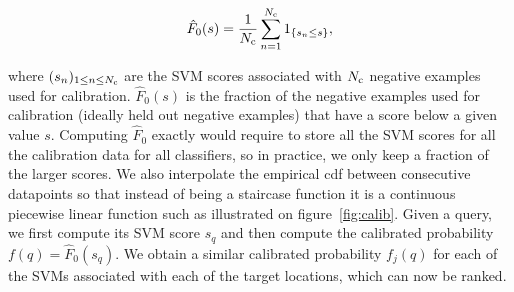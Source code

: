       \begin{equation}
        \hat{F}_0(s)=\frac{1}{N_{\text{c}}} \sum_{n=1}^{N_{\text{c}}} 1_{\{s_n \leq s\}},
        \label{eq:empiricalCDF}
      \end{equation}

      \noindent
      where $(s_n)_{1\leq n \leq N_{\text{c}} }$ are the SVM scores associated with $N_{\text{c}}$ negative examples used for calibration.
      $\hat{F}_0(s)$ 
      is the fraction of the negative examples used for calibration (ideally held out negative examples) that have a score below a given value $s$.
      Computing $\hat{F}_0$ exactly would require to store all the SVM scores for all the calibration data for all classifiers, so in practice, we only keep a fraction of the larger scores.
      We also interpolate the empirical cdf between consecutive datapoints so that instead of being a staircase function it is a continuous piecewise linear function such as illustrated on figure~\ref{fig:calib}. Given a query, we first compute its SVM score $s_q$ and then compute the calibrated probability $f(q)=\hat{F}_0(s_q)$.
      We obtain a similar calibrated probability $f_j(q)$ for each of the SVMs associated with each of the target locations, which can now be ranked.

